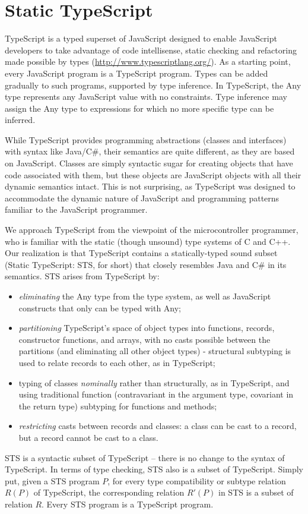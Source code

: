 \section{Static TypeScript}
\label{sec:sts}

TypeScript is a typed superset of JavaScript designed to enable JavaScript developers to take advantage of code 
intellisense, static checking and refactoring made possible by types (\url{http://www.typescriptlang.org/}). 
As a starting point, every JavaScript program is a TypeScript program.  Types can be added gradually to such programs, 
supported by type inference. In TypeScript, the Any type 
represents any JavaScript value with no constraints. Type inference may assign the Any type to expressions for which 
no more specific type can be inferred.

While TypeScript provides programming abstractions (classes and interfaces) with syntax like Java/C\#, their semantics
are quite different, as they are based on JavaScript.  Classes are simply syntactic sugar for creating objects that
have code associated with them, but these objects are JavaScript objects with all their dynamic semantics intact. This
is not surprising, as TypeScript was designed to accommodate the dynamic nature of JavaScript and programming patterns
familiar to the JavaScript programmer. 

We approach TypeScript from the viewpoint of the microcontroller programmer, who is 
familiar with the static (though unsound) type systems of C and C++. Our realization is that TypeScript contains a
statically-typed sound subset (Static TypeScript: STS, for short) that closely resembles Java and C\# in its semantics.
STS arises from TypeScript by:
\begin{itemize}
\item \emph{eliminating} the Any type from the type system, as well as JavaScript constructs that only can be typed with Any;
\item \emph{partitioning} TypeScript's space of object types into functions, records, constructor functions, and arrays, with no casts 
    possible between the partitions (and eliminating all other object types) - structural subtyping is used to relate records 
    to each other, as in TypeScript;
\item typing of classes \emph{nominally} rather than structurally, as in TypeScript, and using traditional function (contravariant 
    in the argument type, covariant in the return type) subtyping for functions and methods;
\item \emph{restricting} casts between records and classes: a class can be cast to a record, but a record cannot be cast to a class.
\end{itemize}
STS is a syntactic subset of TypeScript -- there is no change to the syntax of TypeScript.
In terms of type checking, STS also is a subset of TypeScript. Simply put, given a STS program $P$,
for every type compatibility or subtype relation $R(P)$ of TypeScript, the corresponding relation $R'(P)$ in STS
is a subset of relation $R$. Every STS program is a TypeScript program. 

